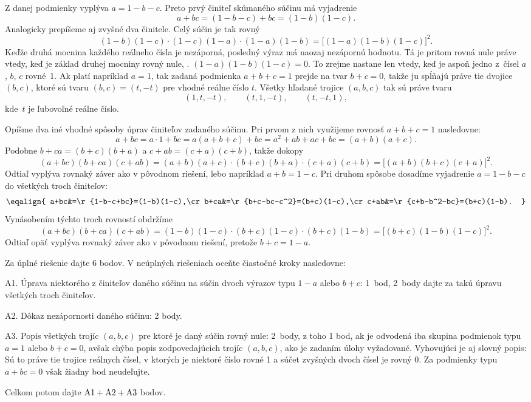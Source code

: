 {%
Z danej podmienky vyplýva $a=1-b-c$. Preto prvý činiteľ skúmaného
súčinu má vyjadrenie
$$
a+bc=(1-b-c)+bc=(1-b)(1-c).
$$
Analogicky prepíšeme aj zvyšné dva činitele. Celý súčin je tak
rovný
$$
(1-b)(1-c)\cdot(1-c)(1-a)\cdot(1-a)(1-b)=\bigl[(1-a)(1-b)(1 -c)\bigr]^2.
$$
Keďže druhá mocnina každého reálneho čísla je nezáporná,
posledný výraz má naozaj nezápornú hodnotu. Tá je pritom rovná
nule práve vtedy, keď je základ druhej mocniny rovný nule, \tj.
$(1-a)(1-b)(1-c)=0$.
To zrejme nastane len vtedy, keď je aspoň jedno z~čísel $a$, $b$,
$c$ rovné~1. Ak platí napríklad $a=1$, tak zadaná podmienka $a+b+c=1$
prejde na tvar $b+c=0$, takže ju spĺňajú práve
tie dvojice $(b,c)$, ktoré sú tvaru $(b,c)=(t,-t)$
pre vhodné reálne číslo $t$. Všetky hľadané trojice $(a,b,c)$
tak sú práve tvaru
$$
(1,t,-t),\qquad (t,1,-t),\qquad (t,-t,1),
$$
kde~$t$ je ľubovoľné reálne číslo.

\poznamka
Opíšme dva iné vhodné spôsoby úprav činiteľov
zadaného súčinu.
\smallskip
Pri prvom z nich využijeme rovnosť $a+b+c=1$ nasledovne:
$$
a+bc=a\cdot1+bc=a(a+b+c)+bc=a^2+ab+ac+bc=(a+b)(a+c).
$$
Podobne $b+ca=(b+c)(b+a)$ a $c+ab=(c+a)(c+b)$, takže dokopy
$$
(a+bc)(b+ca)(c+ab)=(a+b)(a+c)\cdot(b+c)(b+a)\cdot(c+a)(c+b) =
\bigl[(a+b)(b+c)(c+a)\bigr]^2.
$$
Odtiaľ vyplýva rovnaký záver ako v pôvodnom riešení,
lebo napríklad $a+b=1-c$.
\smallskip
Pri druhom spôsobe dosadíme vyjadrenie $a=1-b-c$ do všetkých troch
činiteľov:
$$\setbox7=\hbox{$c+b-b^2-bc$}\def\r#1{\hbox to \wd7{$#1$}}
\eqalign{
a+bc&=\r{1-b-c+bc}=(1-b)(1-c),\cr
b+ca&=\r{b+c-bc-c^2}=(b+c)(1-c),\cr
c+ab&=\r{c+b-b^2-bc}=(b+c)(1-b).
}$$
Vynásobením týchto troch rovností obdržíme
$$
(a+bc)(b+ca)(c+ab)=(1-b)(1-c)\cdot(b+c)(1-c)\cdot(b+c)(1-b) =
\bigl[(b+c)(1-b)(1-c)\bigr]^2.
$$
Odtiaľ opäť vyplýva rovnaký záver ako v pôvodnom riešení, pretože
$b+c=1-a$.

\schemaABC
Za úplné riešenie dajte 6 bodov. V neúplných riešeniach oceňte čiastočné kroky nasledovne:

\medskip
\item{A1.} Úprava niektorého z činiteľov daného súčinu na súčin dvoch výrazov typu $1-a$ alebo $b+c$: 1~bod, 2~body dajte za takú úpravu všetkých troch činiteľov.
\item{A2.} Dôkaz nezápornosti daného súčinu: 2 body.
\item{A3.} Popis všetkých trojíc $(a,b,c)$ pre ktoré je daný súčin rovný nule: 2~body, z toho 1 bod, ak je odvodená iba skupina podmienok typu $a=1$ alebo $b+c=0$, avšak chýba popis zodpovedajúcich trojíc $(a,b,c)$, ako je zadaním úlohy vyžadované. Vyhovujúci je aj slovný popis: Sú to práve tie trojice reálnych čísel, v ktorých je niektoré číslo rovné 1 a súčet zvyšných dvoch čísel je rovný 0. Za podmienky typu $a+bc=0$ však žiadny bod neudeľujte.

\medskip\noindent
Celkom potom dajte $\rm A1+A2+A3$ bodov.
\endschema
}

